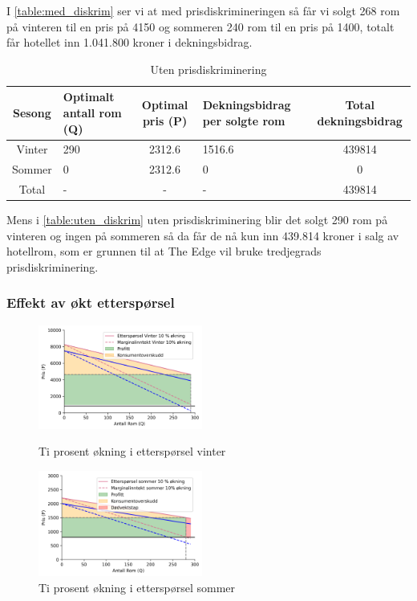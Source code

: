 \documentclass[
  12pt,
  a4paper,
  DIV=11,
  numbers=noendperiod]{scrartcl}
\begin{document}
I \autoref{table:med_diskrim} ser vi at med prisdiskrimineringen så får
vi solgt 268 rom på vinteren til en pris på 4150 og sommeren 240 rom til
en pris på 1400, totalt får hotellet inn 1.041.800 kroner i
dekningsbidrag.

\begin{table}[h]
\centering
\begin{tabular}{|c|p{3cm}|c|p{3cm}|c|}
\hline
Sesong & Optimalt antall rom (Q) & Optimal pris (P) & Dekningsbidrag per solgte rom & Total dekningsbidrag \\
\hline
Vinter & 290 & 2312.6 & 1516.6 & 439814\\
\hline
Sommer & 0 & 2312.6 & 0 & 0 \\
\hline
Total & - & - & - & 439814 \\
\hline
\end{tabular}
\caption{Uten prisdiskriminering}
\label{table:uten_diskrim}
\end{table}

Mens i \autoref{table:uten_diskrim} uten prisdiskriminering blir det
solgt 290 rom på vinteren og ingen på sommeren så da får de nå kun inn
439.814 kroner i salg av hotellrom, som er grunnen til at The Edge vil
bruke tredjegrads prisdiskriminering.

\clearpage

\subsubsection{Effekt av økt
etterspørsel}\label{effekt-av-uxf8kt-etterspuxf8rsel}

\begin{figure}
  \includegraphics[width=0.48\textwidth]{dokumentobjekter/figurer/prisdiskriminering_vinter_okning_.png}
  \caption{Ti prosent økning i etterspørsel vinter}
  \label{fig:okning_ep_vinter}
  \includegraphics[width=0.48\textwidth]{dokumentobjekter/figurer/prisdiskriminering_sommer_okning_.png}
  \caption{Ti prosent økning i etterspørsel sommer}
  \label{fig:okning_ep_sommer}
  \vspace{-12mm}
\end{figure}
\end{document}
